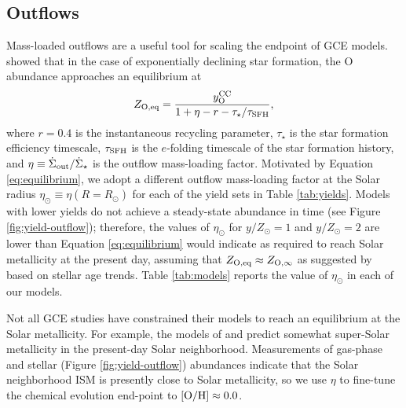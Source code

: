 \documentclass[twocolumn,twocolappendix,linenumbers]{aastex631}
\newcommand{\mathOH}{{\rm [O/H]}}
\newcommand{\yZ}[1]{$y/Z_\odot=#1$}
\begin{document}
\subsection{Outflows}
\label{sec:outflows}

Mass-loaded outflows are a useful tool for scaling the endpoint of GCE models. \citet{weinberg_equilibrium_2017} showed that in the case of exponentially declining star formation, the O abundance approaches an equilibrium at
\begin{equation}
    \label{eq:equilibrium}
    Z_{\rm O,eq} = \frac{y_{\rm O}^{\rm CC}}{1 + \eta - r - \tau_\star/\tau_{\rm SFH}},
\end{equation}
where $r=0.4$ is the instantaneous recycling parameter, $\tau_\star$ is the star formation efficiency timescale, $\tau_{\rm SFH}$ is the $e$-folding timescale of the star formation history, and $\eta\equiv \dot\Sigma_{\rm out}/\dot\Sigma_\star$ is the outflow mass-loading factor. Motivated by Equation \ref{eq:equilibrium}, we adopt a different outflow mass-loading factor at the Solar radius $\eta_\odot\equiv\eta(R=R_\odot)$ for each of the yield sets in Table \ref{tab:yields}. Models with lower yields do not achieve a steady-state abundance in time (see Figure \ref{fig:yield-outflow}); therefore, the values of $\eta_\odot$ for \yZ{1} and \yZ{2} are lower than Equation \ref{eq:equilibrium} would indicate as required to reach Solar metallicity at the present day, assuming that $Z_{\rm O,eq}\approx Z_{\rm O,\infty}$ as suggested by \citet{johnson_milky_2024} based on stellar age trends. Table \ref{tab:models} reports the value of $\eta_\odot$ in each of our models.

Not all GCE studies have constrained their models to reach an equilibrium at the Solar metallicity. For example, the models of \citet{palla_chemical_2020} and \citet{spitoni_remind_2024} predict somewhat super-Solar metallicity in the present-day Solar neighborhood. Measurements of gas-phase \citep[e.g.,][]{mendez-delgado_gradients_2022} and stellar (Figure \ref{fig:yield-outflow}) abundances  indicate that the Solar neighborhood ISM is presently close to Solar metallicity, so we use $\eta$ to fine-tune the chemical evolution end-point to $\mathOH\approx0.0$.
\end{document}
